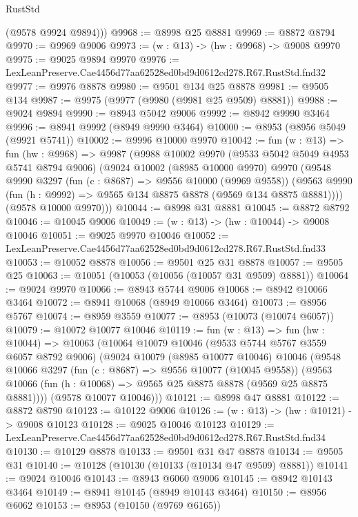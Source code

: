 \begin{lexlean}{RustStd}
\begin{coremodule}
        (@9578 @9924 @9894)))
@9968 := @8998 @25 @8881
@9969 := @8872 @8794
@9970 := @9969 @9006
@9973 := (w : @13) -> (hw : @9968) -> @9008 @9970
@9975 := @9025 @9894 @9970
@9976 := LexLeanPreserve.Cae4456d77aa62528ed0bd9d0612cd278.R67.RustStd.fnd32
@9977 := @9976 @8878
@9980 := @9501 @134 @25 @8878
@9981 := @9505 @134
@9987 := @9975 (@9977 (@9980 (@9981 @25 @9509) @8881))
@9988 := @9024 @9894
@9990 := @8943 @5042 @9006
@9992 := @8942 @9990 @3464
@9996 := @8941 @9992 (@8949 @9990 @3464)
@10000 := @8953 (@8956 @5049 (@9921 @5741))
@10002 := @9996 @10000 @9970
@10042 := fun (w : @13) =>
  fun (hw : @9968) =>
  @9987
    (@9988
      @10002
      @9970
      (@9533 @5042 @5049 @4953 @5741 @8794 @9006)
      (@9024
        @10002
        (@8985 @10000 @9970)
        @9970
        (@9548
          @9990
          @3297
          (fun (c : @8687) => @9556 @10000 (@9969 @9558))
          (@9563 @9990 (fun (h : @9992) => @9565 @134 @8875 @8878 (@9569 @134 @8875 @8881))))
        (@9578 @10000 @9970)))
@10044 := @8998 @31 @8881
@10045 := @8872 @8792
@10046 := @10045 @9006
@10049 := (w : @13) -> (hw : @10044) -> @9008 @10046
@10051 := @9025 @9970 @10046
@10052 := LexLeanPreserve.Cae4456d77aa62528ed0bd9d0612cd278.R67.RustStd.fnd33
@10053 := @10052 @8878
@10056 := @9501 @25 @31 @8878
@10057 := @9505 @25
@10063 := @10051 (@10053 (@10056 (@10057 @31 @9509) @8881))
@10064 := @9024 @9970
@10066 := @8943 @5744 @9006
@10068 := @8942 @10066 @3464
@10072 := @8941 @10068 (@8949 @10066 @3464)
@10073 := @8956 @5767
@10074 := @8959 @3559
@10077 := @8953 (@10073 (@10074 @6057))
@10079 := @10072 @10077 @10046
@10119 := fun (w : @13) =>
  fun (hw : @10044) =>
  @10063
    (@10064
      @10079
      @10046
      (@9533 @5744 @5767 @3559 @6057 @8792 @9006)
      (@9024
        @10079
        (@8985 @10077 @10046)
        @10046
        (@9548
          @10066
          @3297
          (fun (c : @8687) => @9556 @10077 (@10045 @9558))
          (@9563 @10066 (fun (h : @10068) => @9565 @25 @8875 @8878 (@9569 @25 @8875 @8881))))
        (@9578 @10077 @10046)))
@10121 := @8998 @47 @8881
@10122 := @8872 @8790
@10123 := @10122 @9006
@10126 := (w : @13) -> (hw : @10121) -> @9008 @10123
@10128 := @9025 @10046 @10123
@10129 := LexLeanPreserve.Cae4456d77aa62528ed0bd9d0612cd278.R67.RustStd.fnd34
@10130 := @10129 @8878
@10133 := @9501 @31 @47 @8878
@10134 := @9505 @31
@10140 := @10128 (@10130 (@10133 (@10134 @47 @9509) @8881))
@10141 := @9024 @10046
@10143 := @8943 @6060 @9006
@10145 := @8942 @10143 @3464
@10149 := @8941 @10145 (@8949 @10143 @3464)
@10150 := @8956 @6062
@10153 := @8953 (@10150 (@9769 @6165))

\end{coremodule}
\end{lexlean}
